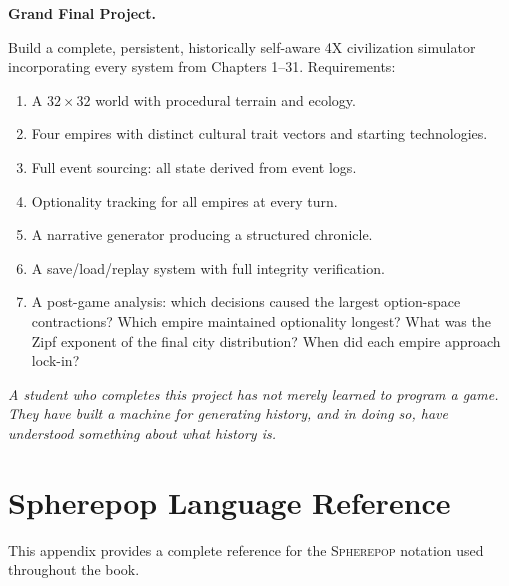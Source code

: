 \documentclass[11pt,a4paper,openany]{book}
\theoremstyle{plain}
\theoremstyle{definition}
\theoremstyle{remark}
\newenvironment{project}[1]{%
  \begin{tcolorbox}[
    title={\textbf{Project: #1}},
    colback=projectbg,
    colframe=sphereblue,
    fonttitle=\bfseries\color{white},
    coltitle=white,
    attach boxed title to top left={yshift=-2mm, xshift=4mm},
    boxed title style={colback=sphereblue, sharp corners},
    sharp corners,
    breakable,
    before upper={\normalfont\setlength{\parindent}{0pt}\tolerance=9999\hbadness=9999}
  ]
}{\end{tcolorbox}}
\newcommand{\Sp}{\textsc{Spherepop}\xspace}
\begin{document}
\begin{project}{Complete Historical Computational Civilization}
  \textbf{Grand Final Project.}

  Build a complete, persistent, historically self-aware 4X civilization
  simulator incorporating every system from Chapters 1--31. Requirements:
  \begin{enumerate}
    \item A $32 \times 32$ world with procedural terrain and ecology.
    \item Four empires with distinct cultural trait vectors and
          starting technologies.
    \item Full event sourcing: all state derived from event logs.
    \item Optionality tracking for all empires at every turn.
    \item A narrative generator producing a structured chronicle.
    \item A save/load/replay system with full integrity verification.
    \item A post-game analysis: which decisions caused the largest
          option-space contractions? Which empire maintained optionality
          longest? What was the Zipf exponent of the final city
          distribution? When did each empire approach lock-in?
  \end{enumerate}

  \medskip
  \noindent\textit{A student who completes this project has not merely
  learned to program a game. They have built a machine for generating
  history, and in doing so, have understood something about what
  history is.}
\end{project}





\appendix


\chapter{Spherepop Language Reference}
\label{app:spherepop}

This appendix provides a complete reference for the \Sp{} notation used
throughout the book.
\end{document}
